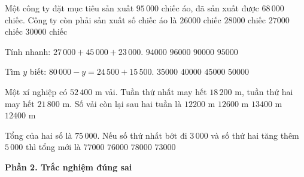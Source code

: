 \begin{ex} %
Một công ty đặt mục tiêu sản xuất $95\,000$ chiếc áo, đã sản xuất được $68\,000$ chiếc. Công ty còn phải sản xuất số chiếc áo là
\choice
{$26000$ chiếc}
{$28000$ chiếc}
{\True $27000$ chiếc}
{$30000$ chiếc}
\end{ex}

\begin{ex} %
Tính nhanh: $27\,000 + 45\,000 + 23\,000$.
\choice
{$94000$}
{$96000$}
{$90000$}
{\True $95000$}
\end{ex}

\begin{ex} %
Tìm $y$ biết: $80\,000 - y = 24\,500 + 15\,500$.
\choice
{$35000$}
{\True $40000$}
{$45000$}
{$50000$}
\end{ex}

\begin{ex} %
Một xí nghiệp có $52\,400\text{ m}$ vải. Tuần thứ nhất may hết $18\,200\text{ m}$, tuần thứ hai may hết $21\,800\text{ m}$. Số vải còn lại sau hai tuần là
\choice
{$12200\text{ m}$}
{$12600\text{ m}$}
{$13400\text{ m}$}
{\True $12400\text{ m}$}
\end{ex}

\begin{ex} %
Tổng của hai số là $75\,000$. Nếu số thứ nhất bớt đi $3\,000$ và số thứ hai tăng thêm $5\,000$ thì tổng mới là
\choice
{\True $77000$}
{$76000$}
{$78000$}
{$73000$}
\end{ex}

\textbf{Phần 2. Trắc nghiệm đúng sai}

